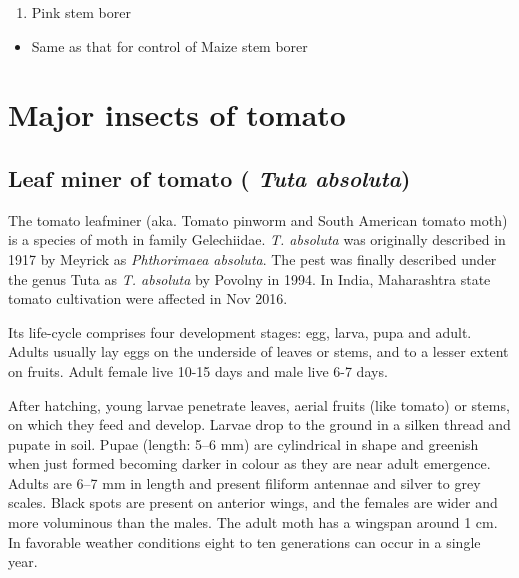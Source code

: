 \documentclass[
]{book}
\providecommand{\tightlist}{%
  \setlength{\itemsep}{0pt}\setlength{\parskip}{0pt}}
\begin{document}
\begin{enumerate}
\def\labelenumi{\arabic{enumi}.}
\setcounter{enumi}{2}
\tightlist
\item
  Pink stem borer
\end{enumerate}

\begin{itemize}
\tightlist
\item
  Same as that for control of Maize stem borer
\end{itemize}

\hypertarget{major-insects-of-tomato}{%
\section{Major insects of tomato}\label{major-insects-of-tomato}}

\hypertarget{leaf-miner-of-tomato-tuta-absoluta}{%
\subsection{\texorpdfstring{Leaf miner of tomato ( \emph{Tuta absoluta})}{Leaf miner of tomato ( Tuta absoluta)}}\label{leaf-miner-of-tomato-tuta-absoluta}}

The tomato leafminer (aka. Tomato pinworm and South American tomato moth) is a species of moth in family Gelechiidae. \emph{T. absoluta} was originally described in 1917 by Meyrick as \emph{Phthorimaea absoluta}. The pest was finally described under the genus Tuta as \emph{T. absoluta} by Povolny in 1994. In India, Maharashtra state tomato cultivation were affected in Nov 2016.

Its life-cycle comprises four development stages: egg, larva, pupa and adult. Adults usually lay eggs on the underside of leaves or stems, and to a lesser extent on fruits. Adult female live 10-15 days and male live 6-7 days.

After hatching, young larvae penetrate leaves, aerial fruits (like tomato) or stems, on which they feed and develop. Larvae drop to the ground in a silken thread and pupate in soil. Pupae (length: 5--6 mm) are cylindrical in shape and greenish when just formed becoming darker in colour as they are near adult emergence. Adults are 6--7 mm in length and present filiform antennae and silver to grey scales. Black spots are present on anterior wings, and the females are wider and more voluminous than the males. The adult moth has a wingspan around 1 cm. In favorable weather conditions eight to ten generations can occur in a single year.
\end{document}
